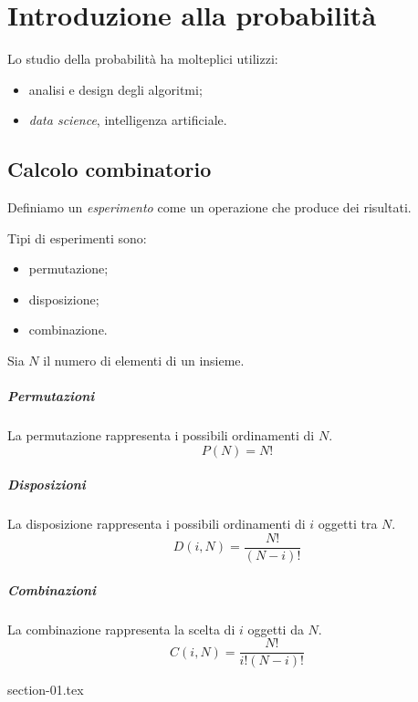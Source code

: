 \chapter{Introduzione alla probabilità}%
\label{cha:Introduzione alla probabilità}
Lo studio della probabilità ha molteplici utilizzi:
\begin{itemize}
  \item analisi e design degli algoritmi;
  \item \textit{data science}, intelligenza artificiale.
\end{itemize}

\section{Calcolo combinatorio}%
\label{sec:Calcolo combinatorio}
Definiamo un \emph{esperimento} come un operazione che produce dei risultati.

Tipi di esperimenti sono:
\begin{itemize}
  \item permutazione;
  \item disposizione;
  \item combinazione.
\end{itemize}

Sia $N$ il numero di elementi di un insieme.

\paragraph{Permutazioni}%
\label{par:Permutazioni}
La permutazione rappresenta i possibili ordinamenti di $N$.
\[
  P(N)=N!
\]

\paragraph{Disposizioni}%
\label{par:Disposizioni}
La disposizione rappresenta i possibili ordinamenti di $i$ oggetti tra $N$.
\[
  D(i,N)= \frac{N!}{(N-i)!} 
\]

\paragraph{Combinazioni}%
\label{par:Combinazioni}
La combinazione rappresenta la scelta di $i$ oggetti da $N$.
\[
  C(i,N)= \frac{N!}{i!(N-i)!}
\]

{section-01.tex}
